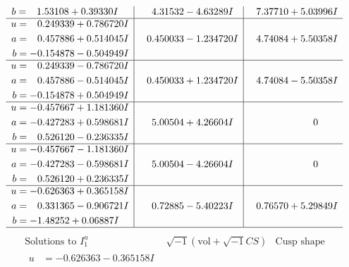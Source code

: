 \documentclass[1p]{elsarticle_modified}
\theoremstyle{definition}
\newcommand{\I}{\sqrt{-1}}
\begin{document}
$$\begin{array}{c|c|c}
\begin{aligned}
b &= \phantom{-}1.53108 + 0.39330 I\end{aligned}
 & \phantom{-}4.31532 - 4.63289 I & \phantom{-}7.37710 + 5.03996 I \\ \hline\begin{aligned}
u &= \phantom{-}0.249339 + 0.786720 I \\
a &= \phantom{-}0.457886 + 0.514045 I \\
b &= -0.154878 - 0.504949 I\end{aligned}
 & \phantom{-}0.450033 - 1.234720 I & \phantom{-}4.74084 + 5.50358 I \\ \hline\begin{aligned}
u &= \phantom{-}0.249339 - 0.786720 I \\
a &= \phantom{-}0.457886 - 0.514045 I \\
b &= -0.154878 + 0.504949 I\end{aligned}
 & \phantom{-}0.450033 + 1.234720 I & \phantom{-}4.74084 - 5.50358 I \\ \hline\begin{aligned}
u &= -0.457667 + 1.181360 I \\
a &= -0.427283 + 0.598681 I \\
b &= \phantom{-}0.526120 - 0.236335 I\end{aligned}
 & \phantom{-}5.00504 + 4.26604 I & \phantom{-0.000000 } 0 \\ \hline\begin{aligned}
u &= -0.457667 - 1.181360 I \\
a &= -0.427283 - 0.598681 I \\
b &= \phantom{-}0.526120 + 0.236335 I\end{aligned}
 & \phantom{-}5.00504 - 4.26604 I & \phantom{-0.000000 } 0 \\ \hline\begin{aligned}
u &= -0.626363 + 0.365158 I \\
a &= \phantom{-}0.331365 - 0.906721 I \\
b &= -1.48252 + 0.06887 I\end{aligned}
 & \phantom{-}0.72885 - 5.40223 I & \phantom{-}0.76570 + 5.29849 I\\
 \hline 
 \end{array}$$\newpage$$\begin{array}{c|c|c}  
\text{Solutions to }I^u_{1}& \I (\text{vol} + \sqrt{-1}CS) & \text{Cusp shape}\\
 \hline 
\begin{aligned}
u &= -0.626363 - 0.365158 I \\

\end{aligned}
\end{array}$$
\end{document}
